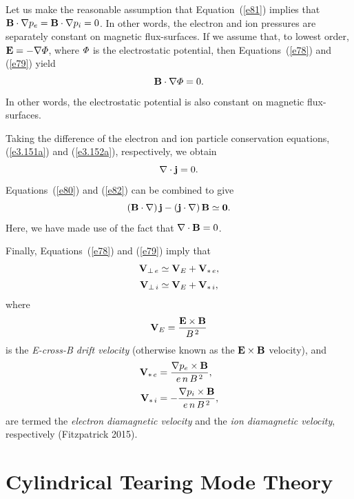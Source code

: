\documentclass[notitlepage,12pt]{article}
\begin{document}
Let us make the reasonable assumption that Equation~(\ref{e81}) implies that ${\bf B}\cdot\nabla p_e={\bf B}\cdot\nabla
p_i=0$. In other words, the electron and ion pressures are separately constant on magnetic flux-surfaces. If we assume that, to lowest order, ${\bf E}=-\nabla{\mit\Phi}$, where ${\mit\Phi}$ is the electrostatic potential, then Equations~(\ref{e78})
and (\ref{e79}) yield
\begin{equation}
{\bf B}\cdot\nabla{\mit\Phi}=0.
\end{equation}
In other words,  the electrostatic potential is also constant on magnetic flux-surfaces. 

 Taking the difference of the electron and ion particle
conservation equations, (\ref{e3.151a}) and (\ref{e3.152a}), respectively, we obtain
\begin{equation}\label{e82}
\nabla\cdot {\bf j} = 0.
\end{equation}
 Equations~(\ref{e80}) and (\ref{e82}) can be combined to give
\begin{equation}\label{e84}
({\bf B}\cdot\nabla)\,{\bf j } - ({\bf j}\cdot\nabla)\,{\bf B} \simeq {\bf 0}.
\end{equation}
Here, we have made use of the fact that $\nabla\cdot{\bf B}=0$. 

Finally, Equations~(\ref{e78}) and (\ref{e79}) imply that
\begin{align}
{\bf V}_{\perp\,e} &\simeq {\bf V}_E + {\bf V}_{\ast\,e},\\[0.5ex]
{\bf V}_{\perp\,i} &\simeq {\bf V}_E + {\bf V}_{\ast\,i},
\end{align}
where
\begin{equation}
{\bf V}_E = \frac{{\bf E}\times {\bf B}}{B^{\,2}}
\end{equation}
is the {\em E-cross-B drift velocity}\/ (otherwise known as  the ${\bf E}\times {\bf B}$ velocity), and
\begin{align}
{\bf V}_{\ast\,e}&= \frac{\nabla p_e\times {\bf B}}{e\,n\,B^{\,2}},\\[0.5ex]
{\bf V}_{\ast\,i}&=- \frac{\nabla p_i\times {\bf B}}{e\,n\,B^{\,2}},
\end{align}
are termed the {\em electron diamagnetic velocity}\/ and the {\em ion diamagnetic velocity}, respectively (Fitzpatrick 2015). 

\section{Cylindrical Tearing Mode Theory}\label{cyl}
\end{document}

